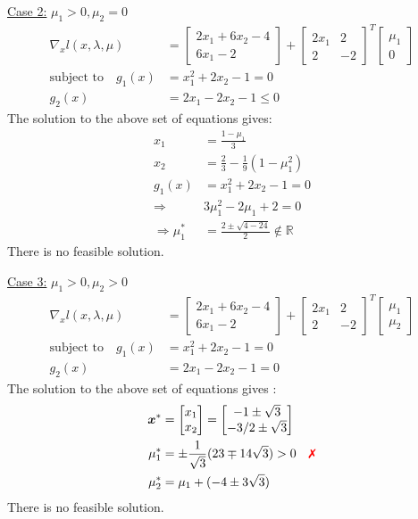 \documentclass[a4paper,11pt]{article}
\newcommand{\V}[1]{\boldsymbol{#1}}
\newcommand{\mat}[1]{\begin{bmatrix}#1\end{bmatrix}}
\newcommand{\xmark}{{\color{red}\text{\ding{55}}}}%
\begin{document}
\noindent\underline{Case 2:} $\mu_1>0,\mu_2=0$
\begin{align*}
 \nabla_x l(x,\lambda,\mu) &= \mat{2x_1 +6x_2 -4\\ 6x_1 -2} +
\mat{2x_1 & 2\\ 2&  -2}^T\mat{\mu_1\\ 0}\\
% 
 \text{subject to}\quad g_1(x)&=x_1^2 +2x_2-1 = 0\\
 g_2(x)&=2x_1-2x_2-1\leq 0
\end{align*}
The solution to the above set of equations gives:
\begin{align*}
x_1 &= \frac{1-\mu_1}{3}\\
x_2 &= \frac{2}{3} - \frac{1}{9}(1-\mu_1^2)\\
g_1(x)&= x_1^2 +2x_2 -1 = 0\\
\Rightarrow& 3\mu_1^2 -2\mu_1+ 2 = 0\\
\Rightarrow \mu_1^*&= \frac{2\pm\sqrt{4-24}}{2} \notin \mathbb{R}  
\end{align*}
There is no feasible solution.

\noindent\underline{Case 3:} $\mu_1>0, \mu_2>0$
\begin{align*}
 \nabla_x l(x,\lambda,\mu) &= \mat{2x_1 +6x_2 -4\\ 6x_1 -2} +
\mat{2x_1 & 2\\ 2&  -2}^T\mat{\mu_1\\ \mu_2}\\
% 
 \text{subject to}\quad g_1(x)&=x_1^2 +2x_2-1 = 0\\
 g_2(x)&=2x_1-2x_2-1= 0
\end{align*}
The solution to the above set of equations gives :
\begin{align*}
 \V{x}^*&=\mat{x_1\\x_2} = \mat{-1\pm \sqrt{3}\\-3/2 \pm \sqrt{3}}\\
 \mu_1^*&=\pm\frac{1}{\sqrt{3}}(23\mp14\sqrt{3}) >0 \quad \xmark\\
  \mu_2^*&= \mu_1 + (-4\pm3\sqrt{3})
\end{align*}
There is no feasible solution.
\end{document}

